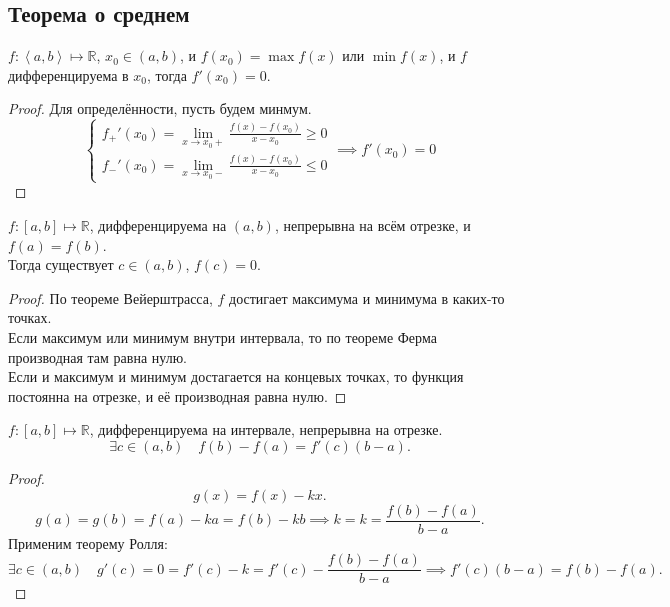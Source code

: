 \documentclass[11pt, oneside]{article}   	%
\begin{document}
    \subsection{Теорема о среднем}
        \begin{theorem}
            $f: \left<a, b\right> \mapsto \mathbb{R}$, $x_0\in \left( a, b \right)$, и $f(x_0) = \max f(x)$ или $\min f(x)$, и $f$ дифференцируема в $x_0$, тогда $f'(x_0) = 0$.
            \begin{proof}
                Для определённости, пусть будем минмум.
                \begin{equation*}
                    \begin{cases}
                        f_{+}'(x_0) = \lim\limits_{x \to x_0+} \frac{f(x) - f(x_0)}{x-x_0} \ge 0\\
                        f_{-}'(x_0) = \lim\limits_{x \to x_0-} \frac{f(x)-f(x_0)}{x-x_0} \le 0 
                    \end{cases}
                    \implies f'(x_0) = 0
                \end{equation*}

            \end{proof}
        \end{theorem}
        \begin{theorem}
            $f: \left[a, b\right] \mapsto \mathbb{R}$, дифференцируема на $\left( a, b \right) $, непрерывна на всём отрезке, и $f(a) = f(b)$.\\
            Тогда существует $c\in \left( a, b \right) $, $f(c) = 0$.\\
            \begin{proof}
                По теореме Вейерштрасса, $f$ достигает максимума и минимума в каких-то точках.\\
                Если максимум или минимум внутри интервала, то по теореме Ферма производная там равна нулю.\\
                Если и максимум и минимум достагается на концевых точках, то функция постоянна на отрезке, и её производная равна нулю.
            \end{proof}
        \end{theorem}
        \begin{theorem}
            $f: \left[a, b\right] \mapsto \mathbb{R}$, дифференцируема на интервале, непрерывна на отрезке.\\
            \[ \exists{c\in \left(a, b\right)}\quad f(b)-f(a) = f'(c)(b-a) .\] 
            \begin{proof}
                \[ g(x) = f(x) - kx .\]
                \[ g(a) = g(b) = f(a) - ka = f(b) - kb \implies k = k = \frac{f(b) - f(a)}{b-a} .\]
                Применим теорему Ролля: \[ \exists{c\in \left( a, b \right) }\quad g'(c) = 0 = f'(c)-k = f'(c) - \frac{f(b)-f(a)}{b-a} \implies f'(c)(b-a) = f(b) - f(a) .\] 
            \end{proof}
        \end{theorem}
\end{document}

